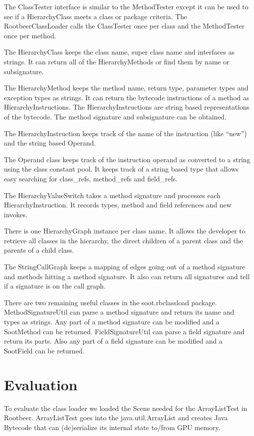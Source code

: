 \documentclass[preprint]{sigplanconf}
\begin{document}
The ClassTester interface is similar to the MethodTester except it can be used to see if a HierarchyClass meets a class or package criteria. The RootbeerClassLoader calls the ClassTester once per class and the MethodTester once per method.

The HierarchyClass keeps the class name, super class name and interfaces as strings. It can return all of the HierarchyMethods or find them by name or subsignature.

The HierarchyMethod keeps the method name, return type, parameter types and exception types as strings. It can return the bytecode instructions of a method as HierarchyInstructions. The HierarchyInstructions are string based representations of the bytecode. The method signature and subsignature can be obtained.

The HierarchyInstruction keeps track of the name of the instruction (like “new”) and the string based Operand.

The Operand class keeps track of the instruction operand as converted to a string using the class constant pool. It keeps track of a string based type that allows easy searching for class\_refs, method\_refs and field\_refs.

The HierarchyValueSwitch takes a method signature and processes each HierarchyInstruction. It records types, method and field references and new invokes.

There is one HierarchyGraph instance per class name. It allows the developer to retrieve all classes in the hierarchy, the direct children of a parent class and the parents of a child class. 


The StringCallGraph keeps a mapping of edges going out of a method signature and methods hitting a method signature. It also can return all signatures and tell if a signature is on the call graph.

There are two remaining useful classes in the soot.rbclassload package. MethodSignatureUtil can parse a method signature and return its name and types as strings. Any part of a method signature can be modified and a SootMethod can be returned. FieldSignatureUtil can parse a field signature and return its parts. Also any part of a field signature can be modified and a SootField can be returned.

\section{Evaluation}
\label{sec:eval}
To evaluate the class loader we loaded the Scene needed for the ArrayListTest in Rootbeer. ArrayListTest goes into the java.util.ArrayList and creates Java Bytecode that can (de)serialize its internal state to/from GPU memory.
\end{document}
